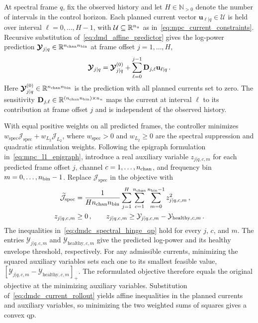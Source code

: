 At spectral frame $q$, fix the observed history and let $H\in\mathbb N_{>0}$ denote the number of intervals in the control horizon.
Each planned current vector $\mathbf u_{\ell|q}\in\mathcal U$ is held over interval $\ell=0,\ldots,H-1$, with $\mathcal U\subseteq\mathbb R^{n_{u}}$ as in~\eqref{eq:mpc_current_constraints}.
Recursive substitution of~\eqref{eq:dmd_affine_predictor} gives the log-power prediction $\boldsymbol{\mathcal{Y}}_{j|q}\in\mathbb R^{n_{\mathrm{chan}}n_{\mathrm{bin}}}$ at frame offset $j=1,\ldots,H$,
%
\begin{equation}
    \boldsymbol{\mathcal{Y}}_{j|q}
    = \boldsymbol{\mathcal{Y}}^{(0)}_{j|q} + \sum_{\ell=0}^{j-1}\mathbf D_{j,\ell}\mathbf u_{\ell|q}\,.
    \label{eq:dmdc_current_rollout}
\end{equation}
%
Here $\boldsymbol{\mathcal{Y}}^{(0)}_{j|q}\in\mathbb R^{n_{\mathrm{chan}}n_{\mathrm{bin}}}$ is the prediction with all planned currents set to zero.
The sensitivity $\mathbf D_{j,\ell}\in\mathbb R^{(n_{\mathrm{chan}}n_{\mathrm{bin}})\times n_{u}}$ maps the current at interval $\ell$ to its contribution at frame offset $j$ and is independent of the observed history.

With equal positive weights on all predicted frames, the controller minimizes $w_{\mathrm{spec}}\mathcal J_{\mathrm{spec}}+w_{L_2}\mathcal J_{L_2}$, where $w_{\mathrm{spec}}>0$ and $w_{L_2}\geq0$ are the spectral suppression and quadratic stimulation weights.
Following the epigraph formulation in~\eqref{eq:mpc_l1_epigraph}, introduce a real auxiliary variable $z_{j|q,c,m}$ for each predicted frame offset $j$, channel $c=1,\ldots,n_{\mathrm{chan}}$, and frequency bin $m=0,\ldots,n_{\mathrm{bin}}-1$.
Replace $\mathcal J_{\mathrm{spec}}$ in the objective with
%
\begin{equation}
    \begin{aligned}
        \widetilde{\mathcal J}_{\mathrm{spec}}
        &= \frac{1}{Hn_{\mathrm{chan}}n_{\mathrm{bin}}}\sum_{j=1}^H\sum_{c=1}^{n_{\mathrm{chan}}}
          \sum_{m=0}^{n_{\mathrm{bin}}-1}z_{j|q,c,m}^2\,, \\
        z_{j|q,c,m}
        &\geq 0\,,\qquad
        z_{j|q,c,m}\geq \mathcal Y_{j|q,c,m}-\mathcal Y_{\mathrm{healthy},c,m}\,.
    \end{aligned}
    \label{eq:dmdc_spectral_hinge_qp}
\end{equation}
%
The inequalities in~\eqref{eq:dmdc_spectral_hinge_qp} hold for every $j$, $c$, and $m$.
The entries $\mathcal Y_{j|q,c,m}$ and $\mathcal Y_{\mathrm{healthy},c,m}$ give the predicted log-power and its healthy envelope threshold, respectively.
For any admissible currents, minimizing the squared auxiliary variables sets each one to its smallest feasible value, ${[\mathcal Y_{j|q,c,m}-\mathcal Y_{\mathrm{healthy},c,m}]}_+$.
The reformulated objective therefore equals the original objective at the minimizing auxiliary variables.
Substitution of~\eqref{eq:dmdc_current_rollout} yields affine inequalities in the planned currents and auxiliary variables, so minimizing the two weighted sums of squares gives a convex \ac{qp}.

